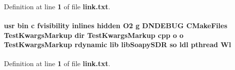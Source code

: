Definition at line {\bf 1} of file {\bf link.\+txt}.

\paragraph[{Wl}]{\setlength{\rightskip}{0pt plus 5cm}usr bin {\bf c} fvisibility inlines hidden O2 g D\+N\+D\+E\+B\+UG C\+Make\+Files Test\+Kwargs\+Markup dir Test\+Kwargs\+Markup cpp o o Test\+Kwargs\+Markup rdynamic lib lib\+Soapy\+S\+DR {\bf so} ldl {\bf pthread} Wl}\label{soapysdr_2build_2tests_2CMakeFiles_2TestKwargsMarkup_8dir_2link_8txt_ab53e72b9cbd032e6310aec2e9bc8c5b7}


Definition at line {\bf 1} of file {\bf link.\+txt}.

